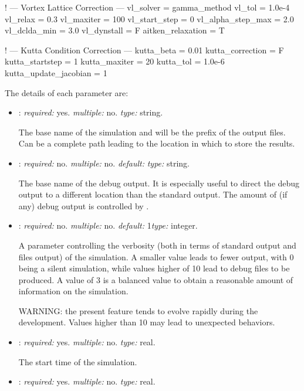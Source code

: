 \begin{inputfile}[frame=single, caption={dust.in}, label={file:dust.in}]
! --- Vortex Lattice Correction ---
vl_solver = gamma_method
vl_tol = 1.0e-4
vl_relax = 0.3
vl_maxiter = 100
vl_start_step = 0
vl_alpha_step_max = 2.0
vl_dclda_min = 3.0
vl_dynstall = F
aitken_relaxation = T 

! --- Kutta Condition Correction ---
kutta_beta = 0.01
kutta_correction = F 
kutta_startstep = 1
kutta_maxiter = 20
kutta_tol = 1.0e-6
kutta_update_jacobian = 1
\end{inputfile}

The details of each parameter are:
\begin{itemize}
\item {}: \textit{required:} yes. \textit{multiple:} no. \textit{type:} string.

The base name of the simulation and will be the prefix of the output files. 
Can be a complete path leading to the location in which to store the results. 

\item {}: \textit{required:} no. \textit{multiple:} no. 
\textit{default:}  \textit{type:} string.

The base name of the debug output. It is especially useful to direct the 
debug output to a different location than the standard output. 
The amount of (if any) debug output is controlled by .

\item {}: \textit{required:} no. \textit{multiple:} no. 
\textit{default:} 1\textit{type:} integer.

A parameter controlling the verbosity (both in terms of standard output and files output) 
of the simulation. A smaller value leads to fewer output, with 0 being a silent simulation, 
while values higher of 10 lead to debug files to be produced. 
A value of 3 is a balanced value to obtain a reasonable amount of information 
on the simulation. 

WARNING: the present feature tends to evolve rapidly during the development. 
Values higher than 10 may lead to unexpected behaviors. 


\item {}: \textit{required:} yes. \textit{multiple:} no. \textit{type:} real.

The start time of the simulation.

\item {}: \textit{required:} yes. \textit{multiple:} no. \textit{type:} real.


\end{itemize}
